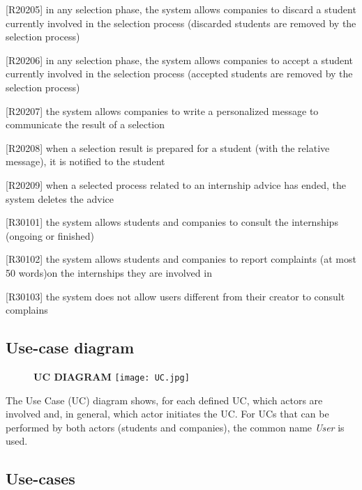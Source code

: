 		[R20205] in any selection phase, the system allows companies to discard a student currently involved in the selection process (discarded students are removed by the selection process)
		
		[R20206] in any selection phase, the system allows companies to accept a student currently involved in the selection process (accepted students are removed by the selection process)
		
		[R20207] the system allows companies to write a personalized message to communicate the result of a selection
		
		[R20208] when a selection result is prepared for a student (with the relative message), it is notified to the student
		
		[R20209] when a selected process related to an internship advice has ended, the system deletes the advice
		
		[R30101] the system allows students and companies to consult the internships (ongoing or finished)
		
		[R30102] the system allows students and companies to report complaints (at most 50 words)on the internships they are involved in
		
		[R30103] the system does not allow users different from their creator to consult complains
		
		\subsection{Use-case diagram}
			
			\begin{figure}[H]
				\centering
				{\bfseries UC DIAGRAM}
				\texttt{[image: UC.jpg]}
				
			\end{figure}
			
			The Use Case (UC) diagram shows, for each defined UC, which actors are involved and, in general, which actor initiates the UC. For UCs that can be performed by both actors (students and companies), the common name \textit{User} is used.
			
			
			
		\subsection{Use-cases}
			
